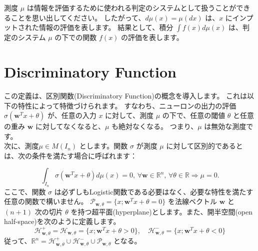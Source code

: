 \documentclass[a4paper]{jsarticle}%
\begin{document}
\begin{rem}
  測度 $\mu$ は情報を評価するために使われる判定のシステムとして扱うことができることを思い出してください。
  したがって、$d\mu(x) = \mu(dx)$ は、$x$ にインプットされた情報の評価を表します。
  結果として、積分 $\int f(x) d\mu(x)$ は、判定のシステム $\mu$ の下での関数 $f(x)$ の評価を表します。
  
\end{rem}
\section{\textbf{Discriminatory Function}}

\begin{dfn}
  この定義は、区別関数(Discriminatory Function)の概念を導入します。
  これは以下の特性によって特徴づけられます。
  すなわち、ニューロンの出力の評価 $\sigma(\mathbf{w}^T x + \theta)$ が、任意の入力 $x$ に対して、測度 $\mu$ の下で、任意の閾値 $\theta$ と任意の重み $\mathbf{w}$ に対してなくなると、$\mu$ も絶対なくなる。
  つまり、$\mu$ は無効な測度です。\\
  次に、測度$\mu \in M(I_n)$ とします。関数 $\sigma$ が測度 $\mu$ に対して区別的であるとは、次の条件を満たす場合に呼ばれます：

  \[
  \int_{I_n} \sigma(\mathbf{w}^T x + \theta)d\mu(x) = 0, \, \forall \mathbf{w} \in \mathbb{R}^n, \, \forall \theta \in \mathbb{R} \Rightarrow \mu = 0.
  \]
  ここで、関数 $\sigma$ は必ずしもLogistic関数である必要はなく、必要な特性を満たす任意の関数で構いません。
  $\mathcal{P}_{\mathbf{w},\theta} = \{x; \mathbf{w}^T x + \theta = 0\}$ を法線ベクトル $\mathbf{w}$ と $(n+1)$ 次の切片 $\theta$ を持つ超平面(hyperplane)とします。また、開半空間(open half-space)を次のように定義します。
  \[
  \mathcal{H}_{\mathbf{w},\theta}^+ = \mathcal{H}_{\mathbf{w},\theta} = \{x; \mathbf{w}^T x + \theta > 0\}, \quad \mathcal{H}_{\mathbf{w},\theta}^- = \{x; \mathbf{w}^T x + \theta < 0\}
  \]
従って、$\mathbb{R}^n = \mathcal{H}_{\mathbf{w},\theta}^+ \cup \mathcal{H}_{\mathbf{w},\theta}^- \cup \mathcal{P}_{\mathbf{w},\theta}$ となる。
\end{dfn}
\end{document}
